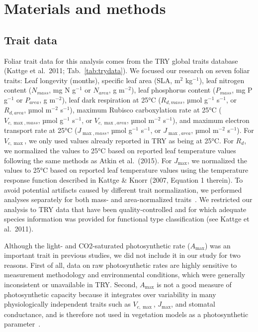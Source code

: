 \section{Materials and methods}\label{sec:mvtraits-methods}

\subsection{Trait data}

Foliar trait data for this analysis comes from the TRY global traits database (Kattge et al.~2011; Tab.~\ref{tab:trydata}). \nocite{kattge_try_2011}
We focused our research on seven foliar traits:
Leaf longevity (months),
specific leaf area (SLA, m$^2$ kg$^{-1}$),
leaf nitrogen content ($N_{mass}$, mg N g$^{-1}$ or $N_{area}$, g m$^{-2}$),
leaf phosphorus content ($P_{mass}$, mg P g$^{-1}$ or $P_{area}$, g m$^{-2}$),
leaf dark respiration at 25°C ($R_{d,mass}$, µmol g$^{-1}$ s$^{-1}$, or $R_{d,area}$, µmol m$^{-2}$ s$^{-1}$),
maximum Rubisco carboxylation rate at 25°C ($V_{c,\max,mass}$, µmol g$^{-1}$ s$^{-1}$, or $V_{c,\max,area}$, µmol m$^{-2}$ s$^{-1}$),
and maximum electron transport rate at 25°C ($J_{\max,mass}$, µmol g$^{-1}$ s$^{-1}$, or $J_{\max,area}$, µmol m$^{-2}$ s$^{-1}$).
For $V_{c,\max}$, we only used values already reported in TRY as being at 25°C.
For $R_{d}$, we normalized the values to 25°C based on reported leaf temperature values following the same methods as Atkin et al.~(2015). \nocite{atkin_global_2015}
For $J_{\max}$, we normalized the values to 25°C based on reported leaf temperature values using the temperature response function described in Kattge \& Knorr (2007, Equation 1 therein). \nocite{kattge_2007_temperature}
To avoid potential artifacts caused by different trait normalization, we performed analyses separately for both mass- and area-normalized traits~\cite{osnas_global_2013,lloyd_les}.
We restricted our analysis to TRY data that have been quality-controlled and for which adequate species information was provided for functional type classification (see Kattge et al.~2011).\nocite{kattge_try_2011}

Although the light- and CO2-saturated photosynthetic rate ($A_{\max}$) was an important trait in previous studies, we did not include it in our study for two reasons.
First of all, data on raw photosynthetic rates are highly sensitive to measurement methodology and environmental conditions, which were generally inconsistent or unavailable in TRY\@.
Second, $A_{\max}$ is not a good measure of photosynthetic capacity because it integrates over variability in many physiologically independent traits such as $V_{c,\max}$, $J_{\max}$, and stomatal conductance, and is therefore not used in vegetation models as a photosynthetic parameter~\cite{Ali_2015}.

